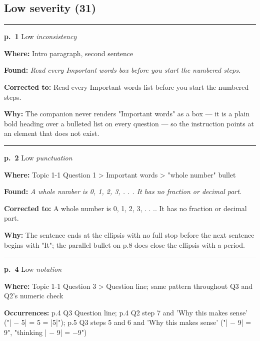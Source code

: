 \documentclass[11pt]{article}
\newcommand{\sevlow}[1]{\textcolor{black!55}{#1}}
\begin{document}
\subsection*{Low severity (31)}
\noindent\rule{\textwidth}{0.4pt}\par\nobreak\vspace{2pt}
\noindent\textbf{p.~1} \quad \sevlow{Low} \quad \textit{inconsistency}\par
\noindent\textbf{Where: }Intro paragraph, second sentence\par
\noindent\textbf{Found: }\textit{Read every Important words box before you start the numbered steps.}\par
\noindent\textbf{Corrected to: }Read every Important words list before you start the numbered steps.\par
\noindent\textbf{Why: }The companion never renders "Important words" as a box --- it is a plain bold heading over a bulleted list on every question --- so the instruction points at an element that does not exist.\par\vspace{4pt}
\noindent\rule{\textwidth}{0.4pt}\par\nobreak\vspace{2pt}
\noindent\textbf{p.~2} \quad \sevlow{Low} \quad \textit{punctuation}\par
\noindent\textbf{Where: }Topic 1-1 Question 1 > Important words > "whole number" bullet\par
\noindent\textbf{Found: }\textit{A whole number is 0, 1, 2, 3, . . . It has no fraction or decimal part.}\par
\noindent\textbf{Corrected to: }A whole number is 0, 1, 2, 3, . . .. It has no fraction or decimal part.\par
\noindent\textbf{Why: }The sentence ends at the ellipsis with no full stop before the next sentence begins with "It"; the parallel bullet on p.8 does close the ellipsis with a period.\par\vspace{4pt}
\noindent\rule{\textwidth}{0.4pt}\par\nobreak\vspace{2pt}
\noindent\textbf{p.~4} \quad \sevlow{Low} \quad \textit{notation}\par
\noindent\textbf{Where: }Topic 1-1 Question 3 > Question line; same pattern throughout Q3 and Q2's numeric check\par
\noindent\textbf{Occurrences: }p.4 Q3 Question line; p.4 Q2 step 7 and 'Why this makes sense' ("| $-$ 5| = 5 = |5|"); p.5 Q3 steps 5 and 6 and 'Why this makes sense' ("| $-$ 9| = 9", "thinking | $-$ 9| = $-$9")\par
\end{document}
